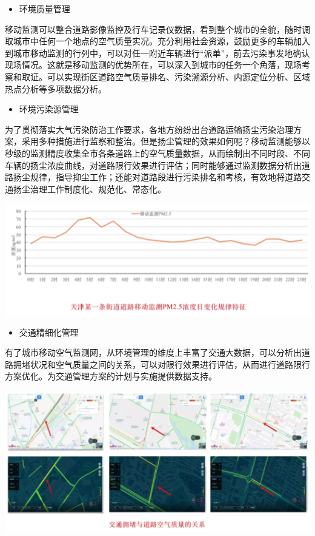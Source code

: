 \documentclass[
]{book}
\providecommand{\tightlist}{%
  \setlength{\itemsep}{0pt}\setlength{\parskip}{0pt}}
\begin{document}
\begin{itemize}
\tightlist
\item
  环境质量管理
\end{itemize}

移动监测可以整合道路影像监控及行车记录仪数据，看到整个城市的全貌，随时调取城市中任何一个地点的空气质量实况。充分利用社会资源，鼓励更多的车辆加入到城市移动监测的行列中，可以对任一附近车辆进行``派单''，前去污染事发地确认现场情况。这就是移动监测的优势所在，可以深入到城市的任务一个角落，现场考察和取证。可以实现街区道路空气质量排名、污染溯源分析、内源定位分析、区域热点分析等多项数据分析。

\begin{itemize}
\tightlist
\item
  环境污染源管理
\end{itemize}

为了贯彻落实大气污染防治工作要求，各地方纷纷出台道路运输扬尘污染治理方案，采用多种措施进行监察和整治。但是扬尘管理的效果如何呢？移动监测能够以秒级的监测精度收集全市各条道路上的空气质量数据，从而绘制出不同时段、不同车辆的扬尘浓度曲线，对道路限行效果进行评估；同时能够通过监测数据分析出道路扬尘规律，指导抑尘工作；还能对道路段进行污染排名和考核，有效地将道路交通扬尘治理工作制度化、规范化、常态化。

\includegraphics[width=6.67in]{images/dlyd3}

\begin{itemize}
\tightlist
\item
  交通精细化管理
\end{itemize}

有了城市移动空气监测网，从环境管理的维度上丰富了交通大数据，可以分析出道路拥堵状况和空气质量之间的关系，可以对限行效果进行评估，从而进行道路限行方案优化。为交通管理方案的计划与实施提供数据支持。

\includegraphics[width=6.67in]{images/dlyd4}
\end{document}
